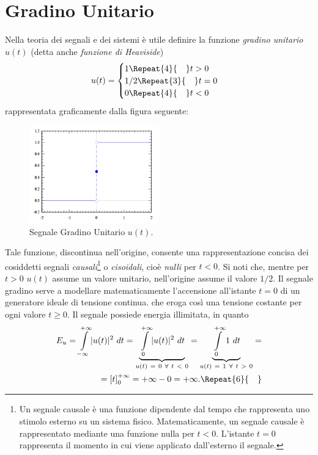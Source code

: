 \documentclass[12pt,oneside,openany]{memoir}
\numberwithin{equation}{subsection}
\DeclarePairedDelimiter{\abs}{\lvert}{\rvert}
\newcommand{\quads}[1]{\Repeat{#1}{\quad}}
\newcommand{\dt}{\ dt}
\begin{document}
\section{Gradino Unitario}
Nella teoria dei segnali e dei sistemi \`e utile definire la funzione
\textit{gradino unitario} $u(t)$ (detta anche \textit{funzione di Heaviside})
\begin{equation}
	u(t) =
		\begin{cases}
			1 \quads{4} t > 0\\
			1/2 \quads{3} t = 0\\
			0 \quads{4} t < 0
		\end{cases}
\end{equation}
rappresentata graficamente dalla figura seguente:
\begin{figure}[H]
	\centering
	\captionsetup{justification=centering}
	\includegraphics[width=0.5\textwidth]{images/heaviside_function.png}
	\caption{Segnale Gradino Unitario $u(t)$.}
\end{figure}
Tale funzione, discontinua nell'origine, consente una rappresentazione concisa
dei cosiddetti segnali \textit{causali}\footnote{Un segnale causale \`e una
funzione dipendente dal tempo che rappresenta uno stimolo esterno su un sistema
fisico. Matematicamente, un segnale causale \`e rappresentato mediante una
funzione nulla per $t < 0$. L'istante $t = 0$ rappresenta il momento in cui
viene applicato dall'esterno il segnale.} o \textit{cisoidali}, cio\`e
\textit{nulli} per $t < 0$. Si noti che, mentre per $t > 0$ $u(t)$ assume un
valore unitario, nell'origine assume il valore $1/2$.
\bigbreak
Il segnale gradino serve a modellare matematicamente l'accensione all'istante
$t = 0$ di un generatore ideale di tensione continua. che eroga cos\`i una
tensione costante per ogni valore $t \geq 0$. Il  segnale possiede energia
illimitata, in quanto
\begin{equation}
	\begin{split}
		E_u = \int\displaylimits_{-\infty}^{+\infty} \abs{u(t)}^2 \dt =
		\underbrace{\int\displaylimits_{0}^{+\infty} \abs{u(t)}^2 \dt}_{
			u(t) \ = \ 0 \ \forall \ t \ < \ 0}
		= \underbrace{\int\displaylimits_{0}^{+\infty} 1 \dt}_{u(t) \
		= \ 1 \ \forall \ t \ > \ 0} =
		\\
		= \left[ t \right]_0^{+\infty} = +\infty - 0 = +\infty.
		\quads{6}
	\end{split}
\end{equation}
\end{document}
